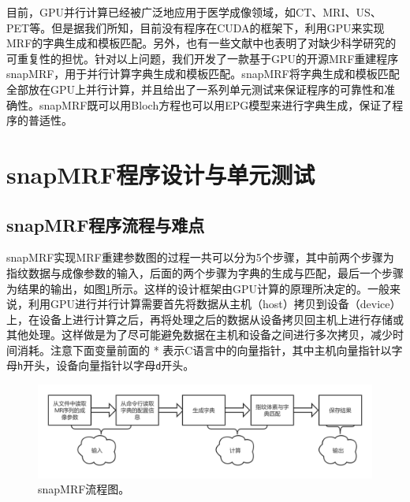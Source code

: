 目前，GPU并行计算已经被广泛地应用于医学成像领域，如CT\cite{biguri2016tigre,palenstijn2011performance}、MRI\cite{Knoll,Sorensen,tron,Eklund2014BROCCOLI,Xanthis2014MRISIMUL}、US\cite{Jung2013GPU,Yakang2010Real}、PET\cite{Garcia2016Accelerated,Cui2013Distributed}等。但是据我们所知，目前没有程序在CUDA的框架下，利用GPU来实现MRF的字典生成和模板匹配。另外，也有一些文献中也表明了对缺少科学研究的可重复性的担忧\cite{vasilevsy_repro_2013,osc_repro_2015,collins_repro_2014,begley_repro_2015}。针对以上问题，我们开发了一款基于GPU的开源MRF重建程序snapMRF，用于并行计算字典生成和模板匹配。snapMRF将字典生成和模板匹配全部放在GPU上并行计算，并且给出了一系列单元测试来保证程序的可靠性和准确性。snapMRF既可以用Bloch方程也可以用EPG模型来进行字典生成，保证了程序的普适性。

\section{snapMRF程序设计与单元测试}
\subsection{snapMRF程序流程与难点}
snapMRF实现MRF重建参数图的过程一共可以分为5个步骤，其中前两个步骤为指纹数据与成像参数的输入，后面的两个步骤为字典的生成与匹配，最后一个步骤为结果的输出，如图\ref{fig:snapmrf}所示。这样的设计框架由GPU计算的原理所决定的。一般来说，利用GPU进行并行计算需要首先将数据从主机（host）拷贝到设备（device）上，在设备上进行计算之后，再将处理之后的数据从设备拷贝回主机上进行存储或其他处理。这样做是为了尽可能避免数据在主机和设备之间进行多次拷贝，减少时间消耗。注意下面变量前面的 * 表示C语言中的向量指针，其中主机向量指针以字母\texttt{h}开头，设备向量指针以字母\texttt{d}开头。
\begin{figure}
\centering
 \includegraphics[width=1\textwidth]{img/snapmrf/snapMRF.png}
\caption{snapMRF流程图。}
\label{fig:snapmrf}
\end{figure}

